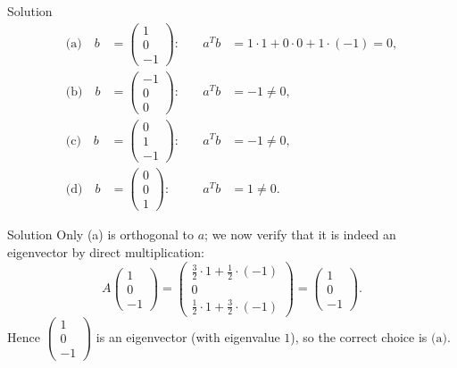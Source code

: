 \documentclass{beamer}
\begin{document}
\begin{frame}{Solution}
\[
\begin{aligned}
\text{(a)}\quad b&=\begin{pmatrix}1\\[2pt]0\\[2pt]-1\end{pmatrix}:
&\quad a^T b &= 1\cdot1 + 0\cdot0 + 1\cdot(-1)=0,\\[6pt]
\text{(b)}\quad b&=\begin{pmatrix}-1\\[2pt]0\\[2pt]0\end{pmatrix}:
&\quad a^T b &= -1\neq0,\\[6pt]
\text{(c)}\quad b&=\begin{pmatrix}0\\[2pt]1\\[2pt]-1\end{pmatrix}:
&\quad a^T b &= -1\neq0,\\[6pt]
\text{(d)}\quad b&=\begin{pmatrix}0\\[2pt]0\\[2pt]1\end{pmatrix}:
&\quad a^T b &= 1\neq0.
\end{aligned}
\]
\end{frame}
\begin{frame}{Solution}
Only (a) is orthogonal to \(a\); we now verify that it is indeed an eigenvector by direct multiplication:
\[
A\begin{pmatrix}1\\[2pt]0\\[2pt]-1\end{pmatrix}
=
\begin{pmatrix}
\frac32\cdot1 + \frac12\cdot(-1)\\[6pt]
0\\[6pt]
\frac12\cdot1 + \frac32\cdot(-1)
\end{pmatrix}
=
\begin{pmatrix}1\\[2pt]0\\[2pt]-1\end{pmatrix}.
\]
Hence \(\begin{pmatrix}1\\0\\-1\end{pmatrix}\) is an eigenvector (with eigenvalue \(1\)), so the correct choice is \(\boxed{\text{(a)}}\).




\end{frame}
\end{document}
